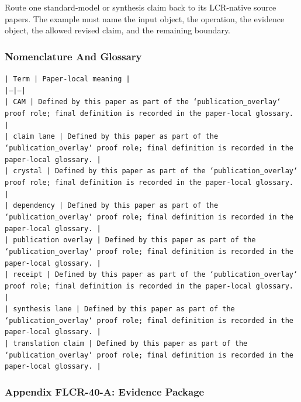 \documentclass[11pt]{article}
\begin{document}
Route one standard-model or synthesis claim back to its LCR-native source papers. The example must name the input object, the operation,
the evidence object, the allowed revised claim, and the remaining boundary.

\subsubsection*{Nomenclature And Glossary}

\noindent\texttt{| Term | Paper-local meaning |}\\
\noindent\texttt{|---|---|}\\
\noindent\texttt{| CAM | Defined by this paper as part of the `publication\_overlay` proof role; final definition is recorded in the paper-local glossary. |}\\
\noindent\texttt{| claim lane | Defined by this paper as part of the `publication\_overlay` proof role; final definition is recorded in the paper-local glossary. |}\\
\noindent\texttt{| crystal | Defined by this paper as part of the `publication\_overlay` proof role; final definition is recorded in the paper-local glossary. |}\\
\noindent\texttt{| dependency | Defined by this paper as part of the `publication\_overlay` proof role; final definition is recorded in the paper-local glossary. |}\\
\noindent\texttt{| publication overlay | Defined by this paper as part of the `publication\_overlay` proof role; final definition is recorded in the paper-local glossary. |}\\
\noindent\texttt{| receipt | Defined by this paper as part of the `publication\_overlay` proof role; final definition is recorded in the paper-local glossary. |}\\
\noindent\texttt{| synthesis lane | Defined by this paper as part of the `publication\_overlay` proof role; final definition is recorded in the paper-local glossary. |}\\
\noindent\texttt{| translation claim | Defined by this paper as part of the `publication\_overlay` proof role; final definition is recorded in the paper-local glossary. |}\\

\subsubsection*{Appendix FLCR-40-A: Evidence Package}
\end{document}
